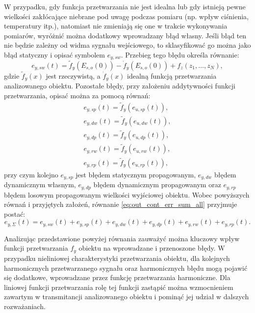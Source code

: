 W przypadku, gdy funkcja przetwarzania nie jest idealna lub gdy istnieją pewne wielkości zakłócające niebrane pod uwagę podczas pomiaru (np. wpływ ciśnienia, temperatury itp.), natomiast nie zmieniają się one w trakcie wykonywania pomiarów, wyróżnić można dodatkowy wprowadzany błąd własny. Jeśli błąd ten nie będzie zależny od widma sygnału wejściowego, to sklasyfikować go można jako błąd statyczny i opisać symbolem $e_{y,sw}$. Przebieg tego błędu określa równanie:
\begin{equation}
e_{y,sw} \left( t \right) = \tilde{f}_{y} \left( E_{s,o} \left( 0 \right) \right) - \dot{f}_{y} \left( E_{s,o} \left( 0 \right) \right) + f_{z} \left( z_{1}, \hdots, z_{N} \right) \label{eq:out_cont_err_stat_self},
\end{equation}
gdzie $\tilde{f}_{y}(x)$ jest rzeczywistą, a $\dot{f}_{y}(x)$ idealną funkcją przetwarzania analizowanego obiektu. Pozostałe błędy, przy założeniu addytywności funkcji przetwarzania, opisać można za pomocą równań:
\begin{gather}
e_{y,sp} \left( t \right) = \tilde{f}_{y} \left( e_{u,sp} \left( t \right) \right) \label{eq:out_cont_err_stat_prop}, \\
e_{y,dw} \left( t \right) = \tilde{f}_{y} \left( e_{u,dw} \left( t \right) \right) \label{eq:out_cont_err_dyn_prop}, \\
e_{y,dp} \left( t \right) = \tilde{f}_{y} \left( e_{u,dp} \left( t \right) \right) \label{eq:out_cont_err_dyn_self}, \\
e_{y,rw} \left( t \right) = \tilde{f}_{y} \left( e_{u,rw} \left( t \right) \right) \label{eq:out_cont_err_rand_self}, \\
e_{y,rp} \left( t \right) = \tilde{f}_{y} \left( e_{u,rp} \left( t \right) \right) \label{eq:out_cont_err_rand_prop},
\end{gather}
przy czym kolejno $e_{y,sp}$ jest błędem statycznym propagowanym, $e_{y,dw}$ błędem dynamicznym własnym, $e_{y,dp}$ błędem dynamicznym propagowanym oraz $e_{y,rp}$ błędem losowym propagowanym wielkości wyjściowej obiektu. Wobec powyższych równań i przyjętych założeń, równanie \eqref{eq:out_cont_err_sum_all} przyjmuje postać:
\begin{equation}
e_{y,\Sigma} \left( t \right) = e_{y,sw} \left( t \right) + e_{y,sp} \left( t \right) + e_{y,dw} \left( t \right) + e_{y,dp} \left( t \right) + e_{y,rw} \left( t \right) + e_{y,rp} \left( t \right) \label{eq:out_cont_err_sum_add}.
\end{equation}

Analizując przedstawione powyżej równania zauważyć można kluczowy wpływ funkcji przetwarzania $f_{y}$ obiektu na wprowadzane i przenoszone błędy. W przypadku nieliniowej charakterystyki przetwarzania obiektu, dla kolejnych harmonicznych przetwarzanego sygnału oraz harmonicznych błędu mogą pojawić się dodatkowe, wprowadzane przez funkcję przetwarzania harmoniczne. Dla liniowej funkcji przetwarzania rolę tej funkcji zastąpić można wzmocnieniem zawartym w transmitancji analizowanego obiektu i pominąć jej udział w dalszych rozważaniach.

